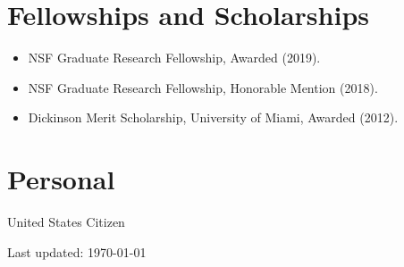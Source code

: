 \documentclass[letterpaper]{article}
\def\footerlink{}
\begin{document}
\section*{Fellowships and Scholarships}
\begin{itemize}
	\item NSF Graduate Research Fellowship, Awarded (2019).
	\item NSF Graduate Research Fellowship, Honorable Mention (2018).
	\item Dickinson Merit Scholarship, University of Miami, Awarded (2012).
\end{itemize}

\section*{Personal}
%
United States Citizen




%
%
%



\bigskip


\begin{center}
  \begin{footnotesize}
    Last updated: \today \\
    \href{\footerlink}{\texttt{\footerlink}}
  \end{footnotesize}
\end{center}
\end{document}
